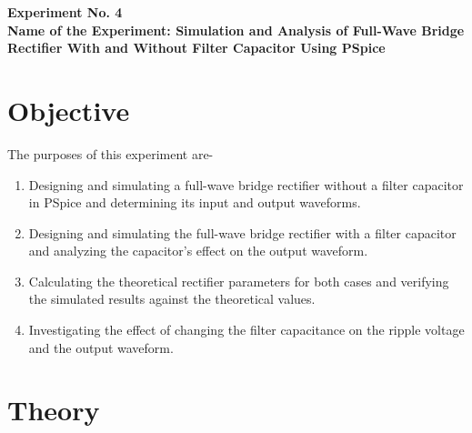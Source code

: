 \documentclass[12pt,a4paper]{article}
\newcommand{\expnumber}{4}
\begin{document}
	
	
	
	
	
	\setcounter{page}{1}
	\begin{center}
		{\large\bfseries Experiment No. \expnumber}\\[4pt]
		{\large\bfseries Name of the Experiment: Simulation and Analysis of
			Full-Wave Bridge Rectifier With and Without Filter Capacitor
			Using PSpice}
	\end{center}
	\vspace{6pt}
	
	\section{Objective}
	The purposes of this experiment are-
	\begin{enumerate}[label=\arabic*.]
		\item Designing and simulating a full-wave bridge rectifier without a filter capacitor in PSpice and determining its input and output waveforms.
		\item Designing and simulating the full-wave bridge rectifier with a filter capacitor and analyzing the capacitor's effect on the output waveform.
		\item Calculating the theoretical rectifier parameters for both cases and verifying the simulated results against the theoretical values.
		\item Investigating the effect of changing the filter capacitance on the ripple voltage and the output waveform.
	\end{enumerate}
	
	\section{Theory}
\end{document}

